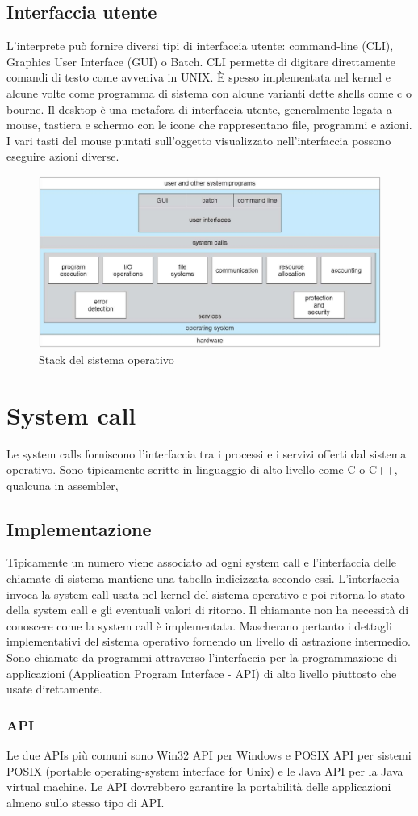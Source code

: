 \subsection{Interfaccia utente}
L'interprete pu\`o fornire diversi tipi di interfaccia utente: command-line (CLI), Graphics User Interface (GUI) o Batch. CLI permette di digitare direttamente comandi di testo come avveniva in UNIX. \`E spesso 
implementata nel kernel e alcune volte come programma di sistema con alcune varianti dette shells come c o bourne. Il desktop \`e una metafora di interfaccia utente, generalmente legata a mouse, tastiera e 
schermo con le icone che rappresentano file, programmi e azioni. I vari tasti del mouse puntati sull'oggetto visualizzato nell'interfaccia possono eseguire azioni diverse. 
\begin{figure}[h]
\includegraphics[width=\textwidth]{Pictures/InterfacciaUtente.png}
\caption{Stack del sistema operativo}
\end{figure}
\section{System call}
Le system calls forniscono l'interfaccia tra i processi e i servizi offerti dal sistema operativo. Sono tipicamente scritte in linguaggio di alto livello come C o C++, qualcuna in assembler, 
\subsection{Implementazione}
Tipicamente un numero viene associato ad ogni system call e l'interfaccia delle chiamate di sistema mantiene una tabella indicizzata secondo essi. L'interfaccia invoca la system call usata nel kernel del sistema 
operativo e poi ritorna lo stato della system call e gli eventuali valori di ritorno. Il chiamante non ha necessit\`a di conoscere come la system call \`e implementata. Mascherano pertanto i dettagli implementativi 
del sistema operativo fornendo un livello di astrazione intermedio. Sono chiamate da programmi attraverso l'interfaccia per la programmazione di applicazioni (Application Program Interface - API) di alto livello
piuttosto che usate direttamente. 
\subsubsection{API}
Le due APIs pi\`u comuni sono Win32 API per Windows e POSIX API per sistemi POSIX (portable operating-system interface for Unix) e le Java API per la Java virtual machine. Le API dovrebbero garantire la 
portabilit\`a delle applicazioni almeno sullo stesso tipo di API. 
